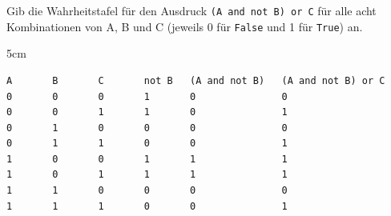 \question[6]
Gib die Wahrheitstafel für den Ausdruck \texttt{(A and not B) or C} für alle acht
Kombinationen von A, B und C (jeweils 0 für \texttt{False} und 1 für \texttt{True}) an.

\begin{solutionbox}{5cm}
\begin{lstlisting}
A       B       C       not B   (A and not B)   (A and not B) or C
0       0       0       1       0               0
0       0       1       1       0               1
0       1       0       0       0               0
0       1       1       0       0               1
1       0       0       1       1               1
1       0       1       1       1               1
1       1       0       0       0               0
1       1       1       0       0               1
\end{lstlisting}
\end{solutionbox}
